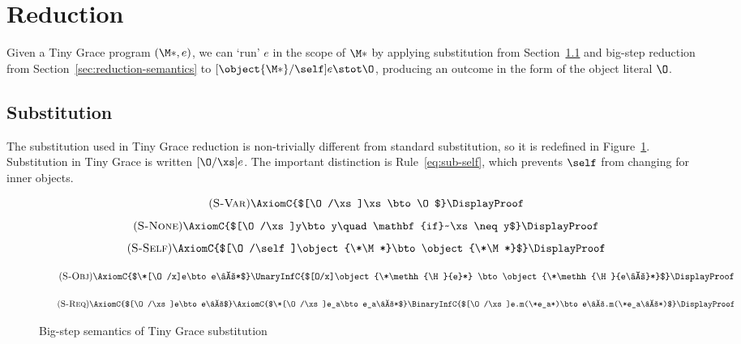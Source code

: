 \section{Reduction}\label{sec:reduction}

Given a Tiny Grace program $(\*\M*, e)$, we can `run' $e$ in the scope of
$\*\M*$ by applying substitution from Section~\ref{sec:substitution} and
big-step reduction from Section~\ref{sec:reduction-semantics} to
$[\object{\*\M*}/\self]e \stot \O$, producing an outcome in the form of the
object literal $\O$.

\subsection{Substitution}\label{sec:substitution}

The substitution used in Tiny Grace reduction is non-trivially different from
standard substitution, so it is redefined in Figure~\ref{fig:substitution}.
Substitution in Tiny Grace is written $[\O/\xs]e$. The important distinction is
Rule~\ref{eq:sub-self}, which prevents $\self$ from changing for inner objects.

\begin{figure}[h]
  \centering
  \newcommand{\name}[1]{\tag{\textsc{S-#1}}}
  \addtolength{\parskip}{-1em}

  \begin{equation}
    \name{Var}\label{eq:sub-var}
    \AxiomC{$[\O/\xs]\xs\bto\O$}
    \DisplayProof
  \end{equation}
%
  \begin{equation}
    \name{None}\label{eq:sub-none}
    \AxiomC{$[\O/\xs]y\bto y\quad\mathbf{if}~\xs\neq y$}
    \DisplayProof
  \end{equation}
  \vspace{-.8em}
  \begin{equation}
    \name{Self}\label{eq:sub-self}
    \AxiomC{$[\O/\self]\object{\*\M*}\bto\object{\*\M*}$}
    \DisplayProof
  \end{equation}

  \begin{equation}
    \name{Obj}\label{eq:sub-obj}
    \AxiomC{$\*[\O/x]e\bto e\′*$}
    \UnaryInfC{$[O/x]\object{\*\methh{\H}{e}*} \bto
      \object{\*\methh{\H}{e\′}*}$}
    \DisplayProof
  \end{equation}

  \begin{equation}
    \name{Req}\label{eq:sub-req}
    \AxiomC{$[\O/\xs]e\bto e\′$}
    \AxiomC{$\*[\O/\xs]e_a\bto e_a\′*$}
    \BinaryInfC{$[\O/\xs]e.m(\*e_a*)\bto e\′.m(\*e_a\′*)$}
    \DisplayProof
  \end{equation}

  \caption{Big-step semantics of Tiny Grace substitution}\label{fig:substitution}
\end{figure}

